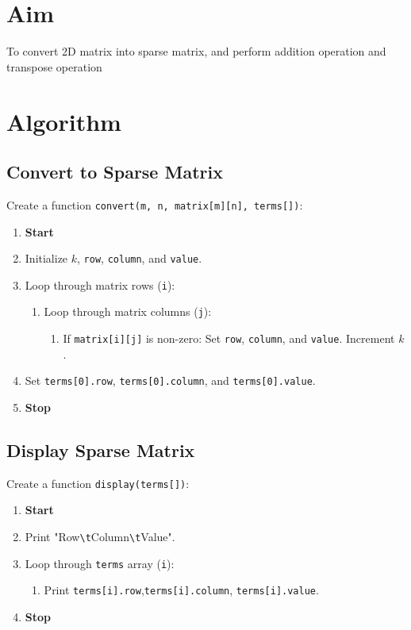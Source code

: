 
\section{Aim}
To convert 2D matrix into sparse matrix, and perform addition operation and transpose operation
\section{Algorithm}
 {\selectfont
  \subsection{Convert to Sparse Matrix}
  Create a function \texttt{convert(m, n, matrix[m][n], terms[])}:
  \begin{enumerate}
    \item \textbf{Start}
    \item Initialize $k$, \texttt{row}, \texttt{column}, and \texttt{value}.
    \item Loop through matrix rows (\texttt{i}):
          \begin{enumerate}[label=2.\arabic*:]
            \item Loop through matrix columns (\texttt{j}):
                  \begin{enumerate}[label=2.1.\arabic*:]
                    \item If \texttt{matrix[i][j]} is non-zero:
                          Set \texttt{row}, \texttt{column}, and \texttt{value}.
                          Increment $k$.
                  \end{enumerate}
          \end{enumerate}
    \item Set \texttt{terms[0].row}, \texttt{terms[0].column}, and \texttt{terms[0].value}.
    \item \textbf{Stop}
  \end{enumerate}

  \subsection{Display Sparse Matrix}
  Create a function \texttt{display(terms[])}:
  \begin{enumerate}
    \item \textbf{Start}
    \item Print "Row\texttt{\textbackslash t}Column\texttt{\textbackslash t}Value".
    \item Loop through \texttt{terms} array (\texttt{i}):
          \begin{enumerate}[label=3.\arabic*:]
            \item Print \texttt{terms[i].row},\texttt{terms[i].column}, \texttt{terms[i].value}.
          \end{enumerate}
    \item \textbf{Stop}
  \end{enumerate}

}
